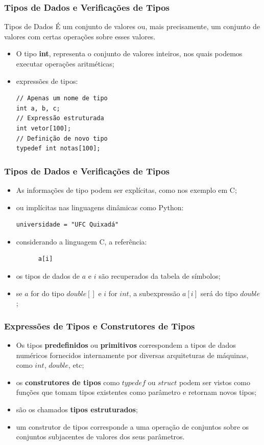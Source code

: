 \documentclass[table]{beamer}
\begin{document}
\begin{frame}[fragile]
   \frametitle{Tipos de Dados e Verificações de Tipos}
   \begin{block}{Tipos de Dados}
   É um conjunto de valores ou, mais precisamente, um conjunto de valores com certas operações sobre esses valores.
   \end{block}
   \begin{itemize}
      \item O tipo \textbf{int}, representa o conjunto de valores inteiros, nos quais podemos executar operações aritméticas;
      \item expressões de tipos:
      \begin{verbatim}
// Apenas um nome de tipo
int a, b, c;
// Expressão estruturada
int vetor[100];
// Definição de novo tipo
typedef int notas[100];
      \end{verbatim}
   \end{itemize}
\end{frame}

\begin{frame}[fragile]
   \frametitle{Tipos de Dados e Verificações de Tipos}
   \begin{itemize}
      \item As informações de tipo podem ser explícitas, como nos exemplo em C;
      \item ou implícitas nas linguagens dinâmicas como Python:
      \begin{verbatim}
universidade = "UFC Quixadá"
      \end{verbatim}
      \item considerando a linguagem C, a referência:
      \begin{verbatim}
      a[i]
      \end{verbatim}
      \item os tipos de dados de $a$ e $i$ são recuperados da tabela de símbolos;
      \item se $a$ for do tipo $double []$ e $i$ for $int$, a subexpressão $a[i]$ será do tipo $double$;
   \end{itemize}
\end{frame}

\begin{frame}
   \frametitle{Expressões de Tipos e Construtores de Tipos}
   \begin{itemize}
      \item Os tipos \textbf{predefinidos} ou \textbf{primitivos} correspondem a tipos de dados numéricos fornecidos internamente por diversas arquiteturas de máquinas, como $int$, $double$, etc;
      \item os \textbf{construtores de tipos} como $typedef$ ou $struct$ podem ser vistos como funções que tomam tipos existentes como parâmetro e retornam novos tipos;
      \item são os chamados \textbf{tipos estruturados};
      \item um construtor de tipos corresponde a uma operação de conjuntos sobre os conjuntos subjacentes de valores dos seus parâmetros.
   \end{itemize}
\end{frame}
\end{document}
